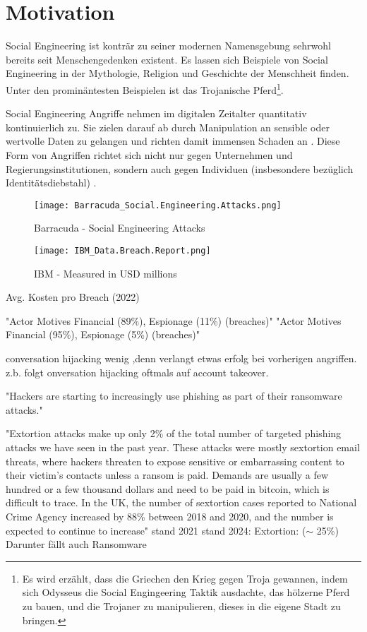 \chapter{Motivation}

Social Engineering ist konträr zu seiner modernen Namensgebung sehrwohl bereits seit
Menschengedenken existent. Es lassen sich Beispiele von Social Engineering in der Mythologie,
Religion und Geschichte der Menschheit finden.
Unter den prominäntesten Beispielen ist das Trojanische Pferd\footnote{Es wird erzählt, dass
die Griechen den Krieg gegen Troja gewannen,
indem sich Odysseus die Social Engingeering Taktik ausdachte, das hölzerne Pferd zu bauen,
und die Trojaner zu manipulieren, dieses in die eigene Stadt zu bringen.}.

Social Engineering Angriffe nehmen im digitalen Zeitalter quantitativ kontinuierlich zu.
Sie zielen darauf ab durch Manipulation an sensible oder wertvolle Daten zu gelangen
und richten damit immensen Schaden an .
Diese Form von Angriffen richtet sich nicht nur gegen Unternehmen und Regierungsinstitutionen,
sondern auch gegen Individuen (insbesondere bezüglich Identitätsdiebstahl) .




\begin{figure}[H]
    \centering
    \texttt{[image: Barracuda\_Social.Engineering.Attacks.png]}
    \caption{Barracuda - Social Engineering Attacks}
\end{figure}

\begin{figure}[H]
    \centering
    \texttt{[image: IBM\_Data.Breach.Report.png]}
    \caption{IBM - Measured in USD millions}
\end{figure}
Avg. Kosten pro Breach (2022)

\newpage

"Actor Motives Financial (89\%), Espionage (11\%) (breaches)"\cite{verizon2022}
"Actor Motives Financial (95\%), Espionage (5\%) (breaches)"\cite{verizon2024}

conversation hijacking wenig ,denn verlangt etwas erfolg bei vorherigen angriffen.
z.b. folgt onversation hijacking oftmals auf account takeover.

"Hackers are starting to increasingly use phishing as part of their
ransomware attacks."\cite{3_barracuda}

"Extortion attacks make up only 2\% of the total number of
targeted phishing attacks we have seen in the past year. These
attacks were mostly sextortion email threats, where hackers
threaten to expose sensitive or embarrassing content to their
victim’s contacts unless a ransom is paid. Demands are usually
a few hundred or a few thousand dollars and need to be paid
in bitcoin, which is difficult to trace. In the UK, the number of
sextortion cases reported to National Crime Agency increased
by 88\% between 2018 and 2020, and the number is expected to
continue to increase"\cite{3_barracuda} stand 2021
stand 2024: Extortion: ($\sim$ 25\%) \cite{verizon2024}
Darunter fällt auch Ransomware

